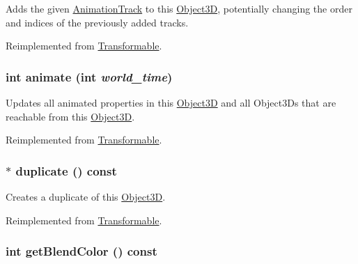 Adds the given \hyperlink{classm3g_1_1AnimationTrack}{AnimationTrack} to this \hyperlink{classm3g_1_1Object3D}{Object3D}, potentially changing the order and indices of the previously added tracks. 

Reimplemented from \hyperlink{classm3g_1_1Transformable_415c0b110f95410ded9b85e5d99a496b}{Transformable}.\hypertarget{classm3g_1_1Texture2D_8aad1ceab4c2a03609c8a42324ce484d}{
\subsubsection[{animate}]{\setlength{\rightskip}{0pt plus 5cm}int animate (int {\em world\_\-time})}}
\label{classm3g_1_1Texture2D_8aad1ceab4c2a03609c8a42324ce484d}


Updates all animated properties in this \hyperlink{classm3g_1_1Object3D}{Object3D} and all Object3Ds that are reachable from this \hyperlink{classm3g_1_1Object3D}{Object3D}. 

Reimplemented from \hyperlink{classm3g_1_1Transformable_8aad1ceab4c2a03609c8a42324ce484d}{Transformable}.\hypertarget{classm3g_1_1Texture2D_f4b50abcea8e4a6d6981c779d5009c05}{
\subsubsection[{duplicate}]{ $\ast$ duplicate () const}}
\label{classm3g_1_1Texture2D_f4b50abcea8e4a6d6981c779d5009c05}


Creates a duplicate of this \hyperlink{classm3g_1_1Object3D}{Object3D}. 

Reimplemented from \hyperlink{classm3g_1_1Transformable_4f64f95a34c56cb1553dc6de660dff6f}{Transformable}.\hypertarget{classm3g_1_1Texture2D_b7dc7b7bf2934448281894f2c1ef3638}{
\subsubsection[{getBlendColor}]{\setlength{\rightskip}{0pt plus 5cm}int getBlendColor () const}}
\label{classm3g_1_1Texture2D_b7dc7b7bf2934448281894f2c1ef3638}



